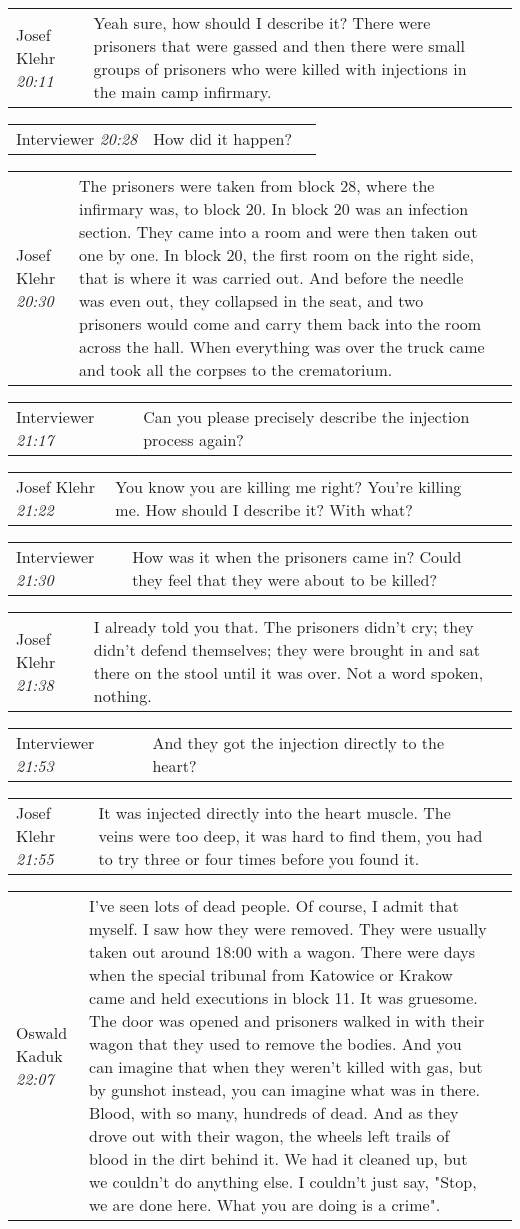 \documentclass{article}
\newcommand{\I}{Interviewer}
\newcommand{\OK}{Oswald Kaduk}
\newcommand{\JK}{Josef Klehr}
\newcommand{\dialogueentry}[4]{
    \begin{center}
    \begin{tabular}{p{1in} p{3.5in} p{1.5in}} 
        #2 \newline \textit{#1} & #3 & \small{#4} 
    \end{tabular}
    \end{center}
}
\newcommand{\twolinebreak}{\newline \newline}
\begin{document}
\dialogueentry{20:11}{\JK}{Yeah sure, how should I describe it? There were prisoners that were gassed and then there were small groups of prisoners who were killed with injections in the main camp infirmary.}{}

\dialogueentry{20:28}{\I}{How did it happen?}{}

\dialogueentry{20:30}{\JK}{The prisoners were taken from block 28, where the infirmary was, to block 20. In block 20 was an infection section. They came into a room and were then taken out one by one.   In block 20, the first room on the right side, that is where it was carried out. And before the needle was even out, they collapsed in the seat, and two prisoners would come and carry them back into the room across the hall. When everything was over the truck came and took all the corpses to the crematorium.}{}

\dialogueentry{21:17}{\I}{Can you please precisely describe the injection process again?}{}

\dialogueentry{21:22}{\JK}{You know you are killing me right? You're killing me. How should I describe it? With what?}{}

\dialogueentry{21:30}{\I}{How was it when the prisoners came in? Could they feel that they were about to be killed?}{}

\dialogueentry{21:38}{\JK}{I already told you that. The prisoners didn't cry; they didn't defend themselves; they were brought in and sat there on the stool until it was over. Not a word spoken, nothing.}{}

\dialogueentry{21:53}{\I}{And they got the injection directly to the heart?}{}

\dialogueentry{21:55}{\JK}{It was injected directly into the heart muscle. The veins were too deep, it was hard to find them, you had to try three or four times before you found it.}{}

\dialogueentry{22:07}{\OK}{I've seen lots of dead people. Of course, I admit that myself. I saw how they were removed. They were usually taken out around 18:00 with a wagon. There were days when the special tribunal from Katowice or Krakow came and held executions in block 11. It was gruesome. 
\twolinebreak
The door was opened and prisoners walked in with their wagon that they used to remove the bodies. And you can imagine that when they weren't killed with gas, but by gunshot instead, you can imagine what was in there. Blood, with so many, hundreds of dead. And as they drove out with their wagon, the wheels left trails of blood in the dirt behind it. We had it cleaned up, but we couldn't do anything else. I couldn't just say, "Stop, we are done here. What you are doing is a crime".}{}
\end{document}

